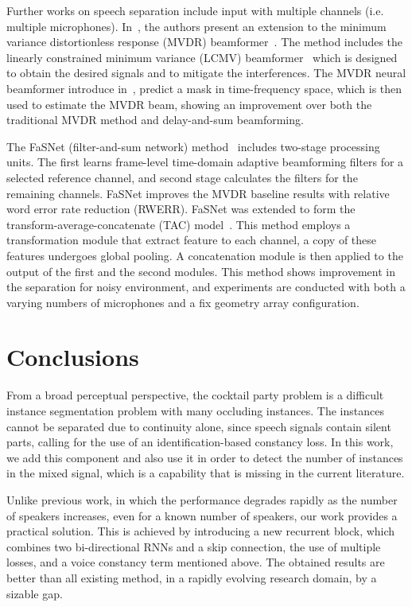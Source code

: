 \documentclass{article}
\begin{document}
Further works on speech separation include input with multiple channels (i.e. multiple microphones). In~\cite{markovich2009multichannel}, the authors present  an extension to the minimum variance distortionless response (MVDR) beamformer~\cite{capon1969high,frost1972algorithm}. The method includes the linearly constrained minimum variance (LCMV) beamformer~\cite{laufer2020global} which is designed to obtain the desired signals and to mitigate the interferences. The MVDR neural beamformer introduce in~\cite{xiao2016study}, predict a mask in time-frequency space, which is then used to estimate the MVDR beam, 
showing an improvement over both the traditional MVDR method and delay-and-sum beamforming.

The FaSNet (filter-and-sum network) method~\cite{luo2019fasnet} includes two-stage processing units. The first learns frame-level time-domain adaptive beamforming filters for a selected reference channel, and second stage calculates the filters for the remaining channels. 
FaSNet improves the MVDR baseline results with  relative word error rate reduction (RWERR). FaSNet was extended to form the transform-average-concatenate (TAC) model~\cite{luo2019end}. This method employs a transformation module that extract feature to each channel, a copy of these features undergoes global pooling. A concatenation module is then applied to the output of the first and the second modules. This method shows improvement in the separation for noisy environment, and experiments are conducted  with both a varying numbers of microphones and a fix geometry array configuration.





 \section{Conclusions}
From a broad perceptual perspective, the cocktail party problem is a difficult instance segmentation problem with many occluding instances. The instances cannot be separated due to continuity alone, since speech signals contain silent parts, calling for the use of an identification-based constancy loss. In this work, we add this component and also use it in order to detect the number of instances in the mixed signal, which is a capability that is missing in the current literature.

Unlike previous work, in which the performance degrades rapidly as the number of speakers increases, even for a known number of speakers, our work provides a practical solution. This is achieved by introducing a new recurrent block, which combines two bi-directional RNNs and a skip connection, the use of multiple losses, and a voice constancy term mentioned above. The obtained results are better than all existing method, in a rapidly evolving research domain, by a sizable gap. 
\end{document}
